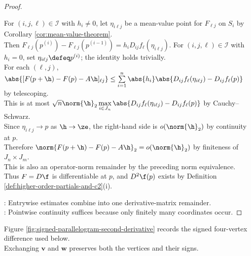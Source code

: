 \begin{theorem}
\begin{proof}
\begin{enumerate}[label=(\roman*)]
For $(i,j,\ell)\in\mathcal I$ with $h_i\neq0$, let $\eta_{i\ell j}$ be a mean-value point for $F_{\ell j}$ on $S_i$ by Corollary \ref{cor:mean-value-theorem}.\\
Then $F_{\ell j}(p^{(i)})-F_{\ell j}(p^{(i-1)})=h_iD_{ij}f_\ell(\eta_{i\ell j})$. For $(i,j,\ell)\in\mathcal I$ with $h_i=0$, set $\eta_{i\ell j}\defeq p^{(i)}$; the identity holds trivially.\\
For each $(\ell,j)$, $\abs{[F(p+\h)-F(p)-A\h]_{\ell j}}\leq\sum\limits_{i=1}^{n}\abs{h_i}\abs{D_{ij}f_\ell(\eta_{i\ell j})-D_{ij}f_\ell(p)}$ by telescoping.\\
This is at most $\sqrt n\norm{\h}_2\max\limits_{i\in J_n}\abs{D_{ij}f_\ell(\eta_{i\ell j})-D_{ij}f_\ell(p)}$ by Cauchy--Schwarz.\\
Since $\eta_{i\ell j}\to p$ as $\h\to\ze$, the right-hand side is $o(\norm{\h}_2)$ by continuity at $p$.\\
Therefore $\norm{F(p+\h)-F(p)-A\h}_2=o(\norm{\h}_2)$ by finiteness of $J_n\times J_m$.\\
This is also an operator-norm remainder by the preceding norm equivalence.\\
Thus $F=D\f$ is differentiable at $p$, and $D^2\f(p)$ exists by Definition \ref{def:higher-order-partials-and-c2}(i).
\end{enumerate}
: Entrywise estimates combine into one derivative-matrix remainder.\\
: Pointwise continuity suffices because only finitely many coordinates occur.
\end{proof}
\end{theorem}

\noindent Figure \ref{fig:signed-parallelogram-second-derivative} records the signed four-vertex difference used below.\\
Exchanging $\mathbf v$ and $\mathbf w$ preserves both the vertices and their signs.
\begin{illustrationfigure}[H]
  \centering
  
  \caption{The $+,-,-,+$ vertex pattern is invariant under exchanging $\mathbf v$ and $\mathbf w$.}
  \label{fig:signed-parallelogram-second-derivative}
\end{illustrationfigure}

